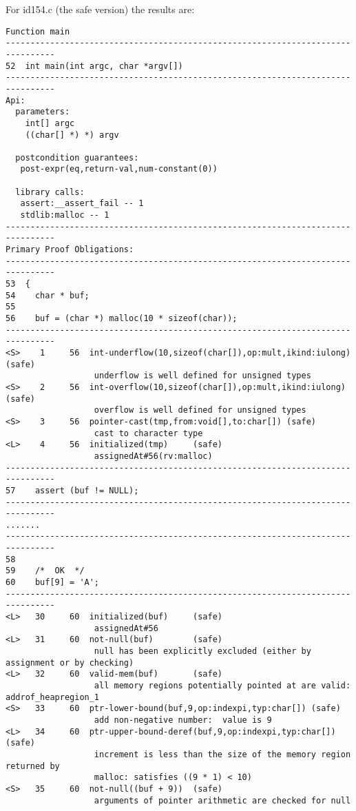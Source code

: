 \documentclass[11pt]{article}
\begin{document}
For id154.c (the safe version) the results are:
\begin{small}
\begin{verbatim}
Function main
--------------------------------------------------------------------------------
52  int main(int argc, char *argv[])
--------------------------------------------------------------------------------
Api:
  parameters:
    int[] argc
    ((char[] *) *) argv

  postcondition guarantees:
   post-expr(eq,return-val,num-constant(0))

  library calls:
   assert:__assert_fail -- 1
   stdlib:malloc -- 1
--------------------------------------------------------------------------------
Primary Proof Obligations:
--------------------------------------------------------------------------------
53  {
54    char * buf;
55
56    buf = (char *) malloc(10 * sizeof(char));
--------------------------------------------------------------------------------
<S>    1     56  int-underflow(10,sizeof(char[]),op:mult,ikind:iulong) (safe)
                  underflow is well defined for unsigned types
<S>    2     56  int-overflow(10,sizeof(char[]),op:mult,ikind:iulong) (safe)
                  overflow is well defined for unsigned types
<S>    3     56  pointer-cast(tmp,from:void[],to:char[]) (safe)
                  cast to character type
<L>    4     56  initialized(tmp)     (safe)
                  assignedAt#56(rv:malloc)
--------------------------------------------------------------------------------
57    assert (buf != NULL);
--------------------------------------------------------------------------------
.......
--------------------------------------------------------------------------------
58
59    /*  OK  */
60    buf[9] = 'A';
--------------------------------------------------------------------------------
<L>   30     60  initialized(buf)     (safe)
                  assignedAt#56
<L>   31     60  not-null(buf)        (safe)
                  null has been explicitly excluded (either by assignment or by checking)
<L>   32     60  valid-mem(buf)       (safe)
                  all memory regions potentially pointed at are valid: addrof_heapregion_1
<S>   33     60  ptr-lower-bound(buf,9,op:indexpi,typ:char[]) (safe)
                  add non-negative number:  value is 9
<L>   34     60  ptr-upper-bound-deref(buf,9,op:indexpi,typ:char[]) (safe)
                  increment is less than the size of the memory region returned by 
                  malloc: satisfies ((9 * 1) < 10)
<S>   35     60  not-null((buf + 9))  (safe)
                  arguments of pointer arithmetic are checked for null

\end{verbatim}
\end{small}
\end{document}
